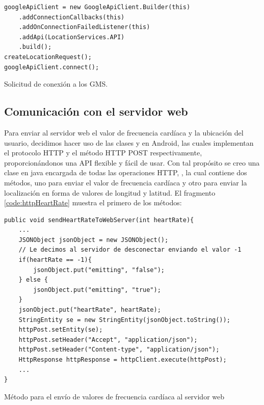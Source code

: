 \begin{listing}[h] 
\begin{verbatim}
googleApiClient = new GoogleApiClient.Builder(this)
    .addConnectionCallbacks(this)
    .addOnConnectionFailedListener(this)
    .addApi(LocationServices.API)
    .build();
createLocationRequest();
googleApiClient.connect();
\end{verbatim}
\caption{Solicitud de conexión a los GMS.}
\label{code:location}
\end{listing}

\subsection{Comunicación con el servidor web}
Para enviar al servidor web el valor de frecuencia cardíaca y la ubicación del usuario, decidimos hacer uso de las clases 
 y  en Android, las cuales implementan el protocolo HTTP y el método HTTP POST respectivamente, proporcionándonos una API flexible y fácil de usar.
Con tal propósito se creo una clase en java encargada de todas las operaciones HTTP, , la cual contiene dos métodos, uno para enviar el valor de frecuencia cardíaca y otro para enviar la localización en forma de valores de longitud y latitud. El fragmento \ref{code:httpHeartRate} muestra el primero de los métodos:

\begin{listing}[h] 
\begin{verbatim}
public void sendHeartRateToWebServer(int heartRate){
	...
    JSONObject jsonObject = new JSONObject();
    // Le decimos al servidor de desconectar enviando el valor -1
    if(heartRate == -1){
        jsonObject.put("emitting", "false");
    } else {
        jsonObject.put("emitting", "true");
    }
    jsonObject.put("heartRate", heartRate);
    StringEntity se = new StringEntity(jsonObject.toString());
    httpPost.setEntity(se);
    httpPost.setHeader("Accept", "application/json");
    httpPost.setHeader("Content-type", "application/json");
    HttpResponse httpResponse = httpClient.execute(httpPost);
    ...
} 
\end{verbatim}
\caption{Método para el envío de valores de frecuencia cardíaca al servidor web}
\label{code:httpHeartRate}
\end{listing}

